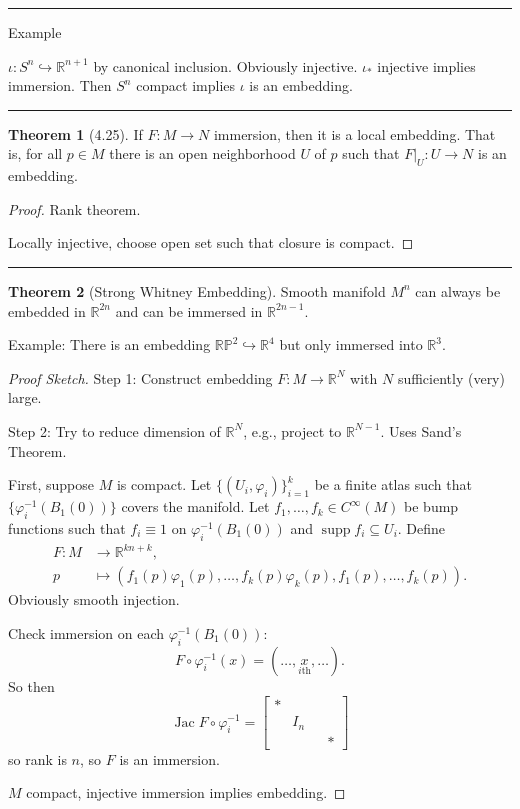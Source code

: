 \documentclass[12pt]{article}
\newcommand{\sepline}{\rule{\textwidth}{0.4pt}}
\theoremstyle{definition}
\newtheorem{theorem}{Theorem}
\newcommand{\R}{\mathbb{R}}
\renewcommand{\P}{\mathbb{P}}
\renewcommand{\phi}{\varphi}
\newcommand{\<}{\left\langle}
\renewcommand{\>}{\right\rangle}
\newcommand{\seq}{\subseteq}
\newcommand{\inc}{\hookrightarrow}
\newcommand{\To}{\longrightarrow}
\newcommand{\Mapsto}{\longmapsto}
\DeclareMathOperator{\supp}{supp}
\DeclareMathOperator{\Jac}{Jac}
\newcommand{\mat}[1]{\begin{bmatrix}#1\end{bmatrix}}
\begin{document}
\sepline

Example

$\iota : S^n \inc \R^{n+1}$ by canonical inclusion.
Obviously injective.
$\iota_*$ injective implies immersion.
Then $S^n$ compact implies $\iota$ is an embedding.

\sepline

\begin{theorem}[4.25]
    If $F : M \to N$ immersion, then it is a local embedding.
    That is, for all $p \in M$ there is an open neighborhood $U$ of $p$ such that $F|_U : U \to N$ is an embedding.
\end{theorem}

\begin{proof}
    Rank theorem.

    Locally injective, choose open set such that closure is compact.
\end{proof}

\sepline

\begin{theorem}[Strong Whitney Embedding]
    Smooth manifold $M^n$ can always be embedded in $\R^{2n}$ and can be immersed in $\R^{2n-1}$.
\end{theorem}

Example: There is an embedding $\R\P^2 \inc \R^4$ but only immersed into $\R^3$.

\begin{proof}[Proof Sketch]
    Step 1: Construct embedding $F : M \to \R^N$ with $N$ sufficiently (very) large.

    Step 2: Try to reduce dimension of $\R^N$, e.g., project to $\R^{N-1}$.
    Uses Sand's Theorem.

    First, suppose $M$ is compact.
    Let $\{(U_i, \phi_i)\}_{i=1}^{k}$ be a finite atlas such that $\{\phi_i^{-1}(B_1(0))\}$ covers the manifold.
    Let $f_1, \dots, f_k \in C^\infty(M)$ be bump functions such that $f_i \equiv 1$ on $\phi_i^{-1}(B_1(0))$ and $\supp f_i \seq U_i$.
    Define
    \begin{align*}
        F : M &\To \R^{kn + k}, \\
            p &\Mapsto (f_1(p)\phi_1(p), \dots, f_k(p)\phi_k(p), f_1(p), \dots, f_k(p)).
    \end{align*}
    Obviously smooth injection.

    Check immersion on each $\phi_i^{-1}(B_1(0))$:
    \[
        F \circ \phi_i^{-1}(x) = (\dots, \underset{i\text{th}}{x}, \dots).
    \]
    So then
    \[
        \Jac F \circ \phi_i^{-1} = \mat{
            * \\
            & I_n \\
            & & & *
        }
    \]
    so rank is $n$, so $F$ is an immersion.

    $M$ compact, injective immersion implies embedding.
\end{proof}
\end{document}
